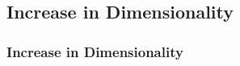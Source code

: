 \documentclass{beamer}
\begin{document}



\subsection{Increase in Dimensionality}
\begin{frame}
	\frametitle{Increase in Dimensionality}
\end{frame}

\end{document}
